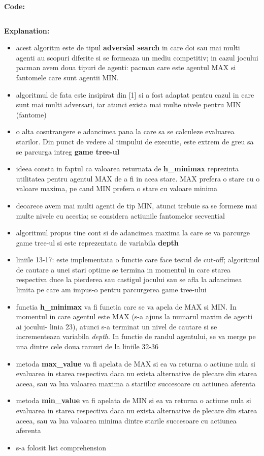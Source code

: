 \textbf{Code:}

\inputminted[linenos]{python}{code/09_h_minimax.py}


\textbf{Explanation:}
\begin{itemize}
    \setlength\itemsep{0em}
    \item acest algoritm este de tipul \textbf{adversial search} in care doi sau mai multi agenti au scopuri diferite si se formeaza un mediu competitiv; in cazul jocului pacman avem doua tipuri de agenti: pacman care este agentul MAX si fantomele care sunt agentii MIN. 
    \item algoritmul de fata este insipirat din [1] si a fost adaptat pentru cazul in care sunt mai multi adversari, iar atunci exista mai multe nivele pentru MIN (fantome)
    \item o alta cosntrangere e adancimea pana la care sa se calculeze evaluarea starilor. Din punct de vedere al timpului de executie, este extrem de greu sa se parcurga intreg \textbf{game tree-ul} 
    \item ideea consta in faptul ca valoarea returnata de  \textbf{h\_minimax}  reprezinta utilitatea pentru agentul MAX de a fi in acea stare. MAX prefera o stare cu o valoare maxima, pe cand MIN prefera o stare cu valoare minima
    \item deoarece avem mai multi agenti de tip MIN, atunci trebuie sa se formeze mai multe nivele cu acestia; se considera actiunile fantomelor secvential 
    \item algoritmul propus tine cont si de adancimea maxima la care se va parcurge game tree-ul si este reprezentata de variabila \textbf{depth}
    \item liniile 13-17: este implementata o functie care face testul de cut-off; algoritmul de cautare a unei stari optime se termina in momentul in care starea respectiva duce la pierderea sau castigul jocului sau se afla la adancimea limita pe care am impus-o pentru parcurgerea game tree-ului
    \item functia \textbf{h\_minimax} va fi functia care se va apela de MAX si MIN. In momentul in care agentul este MAX (s-a ajuns la numarul maxim de agenti ai jocului- linia 23), atunci s-a terminat un nivel de cautare si se incrementeaza variabila \textit{depth}. In functie de randul agentului, se va merge pe una dintre cele doua ramuri de la liniile 32-36
    \item metoda \textbf{max\_value} va fi apelata de MAX si ea va returna o actiune nula si evaluarea in starea respectiva daca nu exista alternative de plecare din starea aceea, sau va lua valoarea maxima a stariilor succesoare cu actiunea aferenta
    \item metoda \textbf{min\_value} va fi apelata de MIN si ea va returna o actiune nula si evaluarea in starea respectiva daca nu exista alternative de plecare din starea aceea, sau va lua valoarea minima dintre starile succesoare cu actiunea aferenta
    \item s-a folosit list comprehension
\end{itemize}


